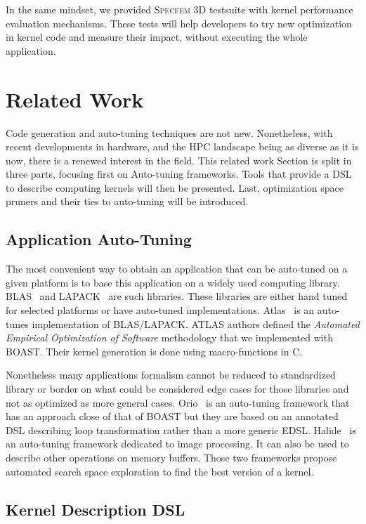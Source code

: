 \documentclass[11pt, a4paper, twoside]{montblanc}
\newcommand{\productname}[1]{\textsc{#1}}
\newcommand{\Specfem}{\productname{Specfem 3D}\xspace}
\begin{document}
In the same mindset, we provided \Specfem testsuite with kernel
performance evaluation mechanisms. These tests will help developers to
try new optimization in kernel code and measure their impact, without
executing the whole application.

\section{Related Work}

Code generation and auto-tuning techniques are not new. Nonetheless, with recent
developments in hardware, and the HPC landscape being as diverse as it is now,
there is a renewed interest in the field. This related work Section is split in
three parts, focusing first on Auto-tuning frameworks. Tools that provide a DSL
to describe computing kernels will then be presented. Last, optimization space
pruners and their ties to auto-tuning will be introduced.

  \subsection{Application Auto-Tuning} 

  The most convenient way to obtain an application that can be auto-tuned on a
given platform is to base this application on a widely used computing library.
BLAS~\cite{dongarra1990set} and LAPACK~\cite{laug} are such libraries. These
libraries are either hand tuned for selected platforms or have auto-tuned
implementations. Atlas~\cite{whaley04} is an auto-tunes implementation of
BLAS/LAPACK. ATLAS authors defined the \emph{Automated Empirical Optimization of
Software} methodology that we implemented with BOAST. Their kernel generation is
done using macro-functions in C.

  Nonetheless many applications formalism cannot be reduced to standardized
library or border on what could be considered edge cases for those libraries and
not as optimized as more general cases. Orio~\cite{Hart2009:Orio} is an
auto-tuning framework that has an approach close of that of BOAST but they are
based on an annotated DSL describing loop transformation rather than a more
generic EDSL. Halide~\cite{ragan2013halide} is an auto-tuning framework
dedicated to image processing. It can also be used to describe other
operations on memory buffers. Those two frameworks propose automated search
space exploration to find the best version of a kernel.

  \subsection{Kernel Description DSL}
\end{document}
